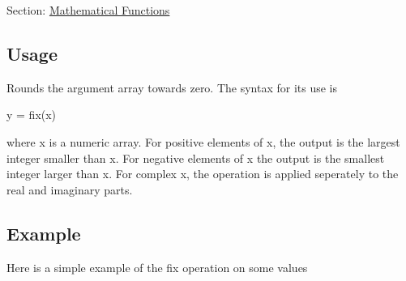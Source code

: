 Section\-: \hyperlink{sec_mathfunctions}{Mathematical Functions} \hypertarget{vtkwidgets_vtkxyplotwidget_Usage}{}\subsection{Usage}\label{vtkwidgets_vtkxyplotwidget_Usage}
Rounds the argument array towards zero. The syntax for its use is \begin{DoxyVerb}   y = fix(x)
\end{DoxyVerb}
 where {\ttfamily x} is a numeric array. For positive elements of {\ttfamily x}, the output is the largest integer smaller than {\ttfamily x}. For negative elements of {\ttfamily x} the output is the smallest integer larger than {\ttfamily x}. For complex {\ttfamily x}, the operation is applied seperately to the real and imaginary parts. \hypertarget{variables_struct_Example}{}\subsection{Example}\label{variables_struct_Example}
Here is a simple example of the {\ttfamily fix} operation on some values


